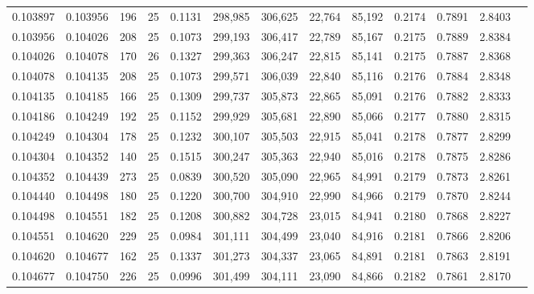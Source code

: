\begin{tabular}{rrrrrrrrrrrrr}
0.103897 & 0.103956 &   196 &  25 &                                     0.1131 & 298,985 & 306,625 &  22,764 &  85,192 & 0.2174 & 0.7891 & 2.8403 \\
0.103956 & 0.104026 &   208 &  25 &                                     0.1073 & 299,193 & 306,417 &  22,789 &  85,167 & 0.2175 & 0.7889 & 2.8384 \\
0.104026 & 0.104078 &   170 &  26 &                                     0.1327 & 299,363 & 306,247 &  22,815 &  85,141 & 0.2175 & 0.7887 & 2.8368 \\
0.104078 & 0.104135 &   208 &  25 &                                     0.1073 & 299,571 & 306,039 &  22,840 &  85,116 & 0.2176 & 0.7884 & 2.8348 \\
0.104135 & 0.104185 &   166 &  25 &                                     0.1309 & 299,737 & 305,873 &  22,865 &  85,091 & 0.2176 & 0.7882 & 2.8333 \\
0.104186 & 0.104249 &   192 &  25 &                                     0.1152 & 299,929 & 305,681 &  22,890 &  85,066 & 0.2177 & 0.7880 & 2.8315 \\
0.104249 & 0.104304 &   178 &  25 &                                     0.1232 & 300,107 & 305,503 &  22,915 &  85,041 & 0.2178 & 0.7877 & 2.8299 \\
0.104304 & 0.104352 &   140 &  25 &                                     0.1515 & 300,247 & 305,363 &  22,940 &  85,016 & 0.2178 & 0.7875 & 2.8286 \\
0.104352 & 0.104439 &   273 &  25 &                                     0.0839 & 300,520 & 305,090 &  22,965 &  84,991 & 0.2179 & 0.7873 & 2.8261 \\
0.104440 & 0.104498 &   180 &  25 &                                     0.1220 & 300,700 & 304,910 &  22,990 &  84,966 & 0.2179 & 0.7870 & 2.8244 \\
0.104498 & 0.104551 &   182 &  25 &                                     0.1208 & 300,882 & 304,728 &  23,015 &  84,941 & 0.2180 & 0.7868 & 2.8227 \\
0.104551 & 0.104620 &   229 &  25 &                                     0.0984 & 301,111 & 304,499 &  23,040 &  84,916 & 0.2181 & 0.7866 & 2.8206 \\
0.104620 & 0.104677 &   162 &  25 &                                     0.1337 & 301,273 & 304,337 &  23,065 &  84,891 & 0.2181 & 0.7863 & 2.8191 \\
0.104677 & 0.104750 &   226 &  25 &                                     0.0996 & 301,499 & 304,111 &  23,090 &  84,866 & 0.2182 & 0.7861 & 2.8170 \\

\end{tabular}
